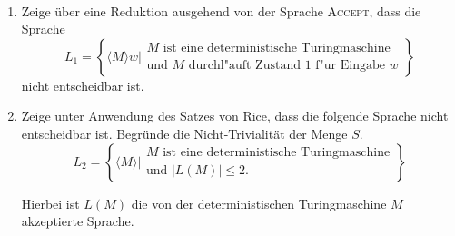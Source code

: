 \documentclass{uebung_cs}
\begin{document}
\begin{aufgabe}\
	\begin{enumerate}
		\item Zeige über eine Reduktion ausgehend von der Sprache \textsc{Accept}, dass die Sprache $$L_1 = \left\{\langle M\rangle w \mathrel{\Bigg|} \begin{array}{l}M\text{ ist eine deterministische Turingmaschine}\\\text{und }M\text{ durchl"auft Zustand 1 f"ur Eingabe }w\end{array}\right\}$$ nicht entscheidbar ist.
		
		\item Zeige unter Anwendung des Satzes von Rice, dass die folgende Sprache nicht entscheidbar ist. Begründe die Nicht-Trivialität der Menge $S$.
 $$L_2 = \left\{\langle M\rangle \mathrel{\Bigg|} \begin{array}{l}M\text{ ist eine deterministische Turingmaschine}\\\text{und } |L(M)| \leq 2.\end{array}\right\}$$
			
		Hierbei ist $L(M)$ die von der deterministischen Turingmaschine $M$ akzeptierte Sprache.
	\end{enumerate}
\end{aufgabe}
\end{document}
